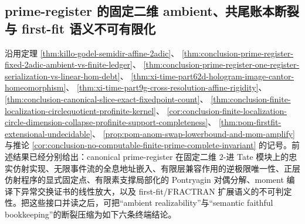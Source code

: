 \subsection{prime-register 的固定二维 ambient、共尾账本断裂与 first-fit 语义不可有限化}\label{subsec:conclusion-prime-register-ambient-firstfit-ledger-fracture}
沿用定理
\ref{thm:killo-godel-semidir-affine-2adic}、
\ref{thm:conclusion-prime-register-fixed-2adic-ambient-vs-finite-ledger}、
\ref{thm:conclusion-prime-register-one-register-serialization-vs-linear-hom-debt}、
\ref{thm:xi-time-part62d-hologram-image-cantor-homeomorphism}、
\ref{thm:xi-time-part9g-cross-resolution-affine-rigidity}、
\ref{thm:conclusion-canonical-slice-exact-fixedpoint-count}、
\ref{thm:conclusion-finite-localization-circlequotient-profinite-kernel}、
\ref{cor:conclusion-finite-localization-circle-dimension-collapse-profinite-support-completeness}、
\ref{thm:pom-firstfit-extensional-undecidable}、
\ref{prop:pom-anom-swap-lowerbound-and-mom-amplify}
与推论
\ref{cor:conclusion-no-computable-finite-prime-complete-invariant}
的记号。前述结果已经分别给出：canonical prime-register 在固定二维 \(2\)-进 Tate 模块上的忠实仿射实现、无限事件流的全息地址嵌入、有限层兼容作用的逆极限唯一性、正层仿射程序的显式固定点、有限素支撑局部化的 Pontryagin 对偶分解、moment 编译下异常交换证书的线性放大，以及 first-fit/FRACTRAN 扩展语义的不可判定性。把这些接口并读之后，可把“ambient realizability”与“semantic faithful bookkeeping”的断裂压缩为如下六条终端结论。

